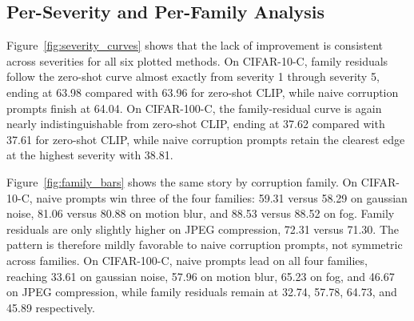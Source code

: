 \documentclass{article}
\begin{document}
\begin{table}[t]
\caption{Main results on CIFAR-10/CIFAR-10-C and CIFAR-100/CIFAR-100-C. Higher is better for accuracies. Seed-dependent rows report mean $\pm$ standard deviation over seeds 7, 17, and 27. Best corruption accuracy in each dataset is in \textbf{bold}.}
\label{tab:main}
\centering
\small
{}
\end{table}

\subsection{Per-Severity and Per-Family Analysis}

Figure~\ref{fig:severity_curves} shows that the lack of improvement is consistent across severities for all six plotted methods. On CIFAR-10-C, family residuals follow the zero-shot curve almost exactly from severity 1 through severity 5, ending at 63.98 compared with 63.96 for zero-shot CLIP, while naive corruption prompts finish at 64.04. On CIFAR-100-C, the family-residual curve is again nearly indistinguishable from zero-shot CLIP, ending at 37.62 compared with 37.61 for zero-shot CLIP, while naive corruption prompts retain the clearest edge at the highest severity with 38.81.

Figure~\ref{fig:family_bars} shows the same story by corruption family. On CIFAR-10-C, naive prompts win three of the four families: 59.31 versus 58.29 on gaussian noise, 81.06 versus 80.88 on motion blur, and 88.53 versus 88.52 on fog. Family residuals are only slightly higher on JPEG compression, 72.31 versus 71.30. The pattern is therefore mildly favorable to naive corruption prompts, not symmetric across families. On CIFAR-100-C, naive prompts lead on all four families, reaching 33.61 on gaussian noise, 57.96 on motion blur, 65.23 on fog, and 46.67 on JPEG compression, while family residuals remain at 32.74, 57.78, 64.73, and 45.89 respectively.
\end{document}
